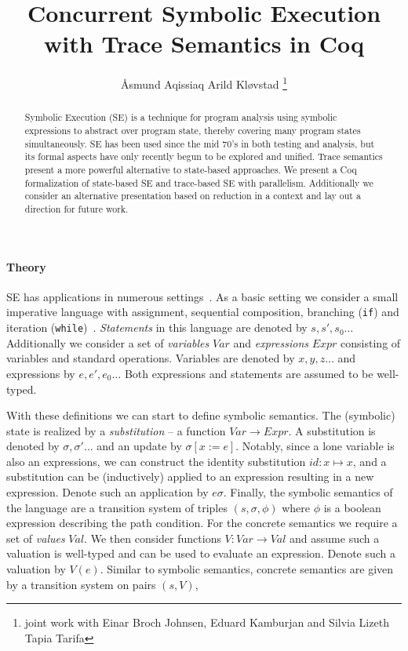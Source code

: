 \documentclass[submission,copyright,creativecommons]{eptcs}
\title{Concurrent Symbolic Execution with Trace Semantics in Coq}
\author{Åsmund Aqissiaq Arild Kløvstad
  \footnote{joint work with Einar Broch Johnsen, Eduard Kamburjan and Silvia Lizeth Tapia Tarifa}
\institute{University of Oslo, Oslo, Norway}
\email{aaklovst@ifi.uio.no}
}
\begin{document}
\maketitle

\begin{abstract}
  Symbolic Execution (SE) is a technique for program analysis using symbolic expressions to abstract over program state,
  thereby covering many program states simultaneously. SE has been used since the mid 70's %
  in both testing and analysis, but its formal aspects have only recently begun to be explored %
  and unified. %
  Trace semantics present a more powerful alternative to state-based approaches.
  We present a Coq formalization of state-based SE and trace-based SE with parallelism.
  Additionally we consider an alternative presentation based on reduction in a context and lay out a direction for future work.
\end{abstract}

\paragraph{Theory}
SE has applications in numerous settings~\cite{king1976symbolic, boyer1975select, Steinhoefel2022}.
As a basic setting we consider a small imperative language with assignment,
sequential composition, branching (\texttt{if}) and iteration (\texttt{while})~\cite{boer2021}.
\emph{Statements} in this language are denoted by $s, s', s_{0}\ldots$
Additionally we consider a set of \emph{variables} $Var$ and \emph{expressions} $Expr$ consisting of variables and
standard operations. Variables are denoted by $x,y,z\ldots$ and expressions by $e, e', e_{0}\ldots$
Both expressions and statements are assumed to be well-typed.

With these definitions we can start to define symbolic semantics. The (symbolic) state is realized by a
\emph{substitution} -- a function $Var \rightarrow Expr$. A substitution is denoted by $\sigma, \sigma'\ldots$
and an update by $\sigma[x := e]$. Notably, since a lone variable is also an expressions, we can construct the
identity substitution $id : x \mapsto x$, and a substitution can be (inductively) applied to an expression resulting
in a new expression. Denote such an application by $e\sigma$.
Finally, the symbolic semantics of the language are a transition system of triples $(s, \sigma, \phi)$
where $\phi$ is a boolean expression describing the path condition.
For the concrete semantics we require a set of \emph{values} $Val$. We then consider functions $V : Var \rightarrow Val$
and assume such a valuation is well-typed and can be used to evaluate an expression. Denote such a valuation by $V(e)$.
Similar to symbolic semantics, concrete semantics are given by a transition system on pairs $(s, V)$,
\end{document}
